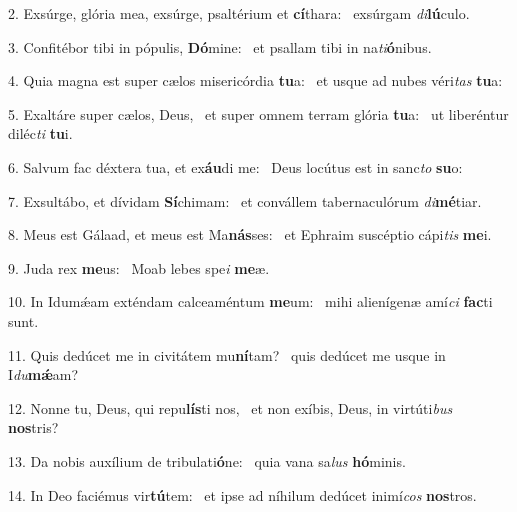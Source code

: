 2. Exsúrge, glória mea, exsúrge, psaltérium et \textbf{cí}thara: \ast\  exsúrgam \textit{di}\textbf{lú}culo.\

3. Confitébor tibi in pópulis, \textbf{Dó}mine: \ast\  et psallam tibi in na\textit{ti}\textbf{ó}nibus.\

4. Quia magna est super cælos misericórdia \textbf{tu}a: \ast\  et usque ad nubes véri\textit{tas} \textbf{tu}a:\

5. Exaltáre super cælos, Deus, \dag\  et super omnem terram glória \textbf{tu}a: \ast\  ut liberéntur diléc\textit{ti} \textbf{tu}i.\

6. Salvum fac déxtera tua, et ex\textbf{áu}di me: \ast\  Deus locútus est in sanc\textit{to} \textbf{su}o:\

7. Exsultábo, et dívidam \textbf{Sí}chimam: \ast\  et convállem tabernaculórum \textit{di}\textbf{mé}tiar.\

8. Meus est Gálaad, et meus est Ma\textbf{nás}ses: \ast\  et Ephraim suscéptio cápi\textit{tis} \textbf{me}i.\

9. Juda rex \textbf{me}us: \ast\  Moab lebes spe\textit{i} \textbf{me}æ.\

10. In Idumǽam exténdam calceaméntum \textbf{me}um: \ast\  mihi alienígenæ amí\textit{ci} \textbf{fac}ti sunt.\

11. Quis dedúcet me in civitátem mu\textbf{ní}tam? \ast\  quis dedúcet me usque in I\textit{du}\textbf{mǽ}am?\

12. Nonne tu, Deus, qui repu\textbf{lís}ti nos, \ast\  et non exíbis, Deus, in virtúti\textit{bus} \textbf{nos}tris?\

13. Da nobis auxílium de tribulati\textbf{ó}ne: \ast\  quia vana sa\textit{lus} \textbf{hó}minis.\

14. In Deo faciémus vir\textbf{tú}tem: \ast\  et ipse ad níhilum dedúcet inimí\textit{cos} \textbf{nos}tros.\

